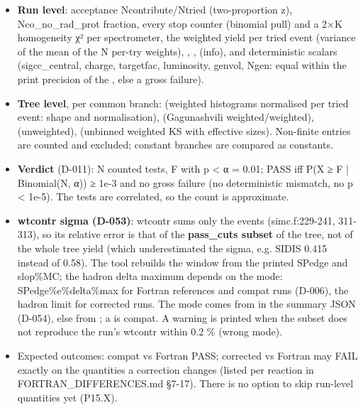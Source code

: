 \begin{itemize}
\item \textbf{Run level}: acceptance Ncontribute/\allowbreak{}Ntried (two-proportion z), Nco\_\allowbreak{}no\_\allowbreak{}rad\_\allowbreak{}prot fraction, every stop counter
(binomial pull) and a 2×K homogeneity χ² per spectrometer,\allowbreak{} the weighted yield per tried event (variance of the mean of
the N per-try weights), , ,  (info), and deterministic scalars (sigcc\_\allowbreak{}central,\allowbreak{}
charge, targetfac, luminosity, genvol, Ngen: equal within the print precision of the , else a gross failure).
\item \textbf{Tree level}, per common branch:  (weighted histograms normalised per tried event: shape and
normalisation),\allowbreak{}  (Gagunashvili weighted/\allowbreak{}weighted),\allowbreak{}  (unweighted),\allowbreak{}  (unbinned weighted KS
with effective sizes). Non-finite entries are counted and excluded; constant branches are compared as constants.
\item \textbf{Verdict} (D-011): N counted tests, F with p < α = 0.01; PASS iff P(X ≥ F | Binomial(N, α)) ≥ 1e-3 and no gross
failure (no deterministic mismatch, no p < 1e-5). The tests are correlated, so the count is approximate.
\item \textbf{wtcontr sigma (D-053)}:  wtcontr sums only the  events (simc.\allowbreak{}f:\allowbreak{}229-241,\allowbreak{} 311-313), so its
relative error is that of the \textbf{pass\_cuts subset} of the tree, not of the whole tree yield (which underestimated the
sigma, e.g. SIDIS 0.415 instead of 0.58). The tool rebuilds the window from the printed SPedge and slop\%MC; the
hadron delta maximum depends on the mode: SPedge\%\allowbreak{}e\%\allowbreak{}delta\%\allowbreak{}max for Fortran references and compat runs (D-006), the
hadron limit for corrected runs. The mode comes from  in the summary JSON (D-054), else from
; a  is compat. A warning is printed when the subset does not reproduce the run's wtcontr
within 0.2 \% (wrong mode).
\item Expected outcomes: compat vs Fortran PASS; corrected vs Fortran may FAIL exactly on the quantities a correction
changes (listed per reaction in FORTRAN\_\allowbreak{}DIFFERENCES.md §7-17). There is no option to skip run-level quantities yet
(P15.X).
\end{itemize}
